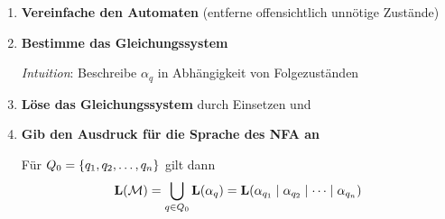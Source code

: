 \documentclass{beamer}
\begin{document}
	\begin{frame}		
		\small
		\begin{enumerate}[(1)]
			\item \textbf{Vereinfache den Automaten} (entferne offensichtlich unnötige Zustände)	
			
			\item \textbf{Bestimme das Gleichungssystem} 
			
			\textit{Intuition}: Beschreibe $\alpha_q$ in Abhängigkeit von Folgezuständen
			
			\item \textbf{Löse das Gleichungssystem} durch Einsetzen und
			
			\item \textbf{Gib den Ausdruck für die Sprache des NFA an}
			
			Für $Q_0 = \left\{ q_1,q_2,\dots, q_n \right\}$ gilt dann
			\begin{equation*}
				\textbf{\textcolor{black}{L}}(\mathcal{M})
				=\bigcup_{q\in Q_0} \textbf{\textcolor{black}{L}}(\alpha_q)
				=  \textbf{\textcolor{black}{L}}(\alpha_{q_1}\mid\alpha_{q_2}\mid\dots\mid \alpha_{q_n})
			\end{equation*}
		\end{enumerate}
	\end{frame}
\end{document}
